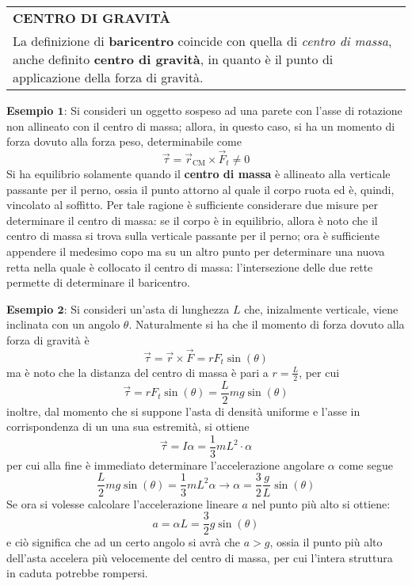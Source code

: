 \documentclass[a4paper]{extarticle}
\renewcommand\arraystretch{}
\begin{document}
\vspace{1em}
\setlength{\tabcolsep}{14pt}
\renewcommand{\arraystretch}{2}
\noindent
\begin{tabularx}{\textwidth}{@{}|P|@{}}
    \hline
    {\textbf{CENTRO DI GRAVITÀ}}\\
    \parbox{\linewidth}{La definizione di \textbf{baricentro} coincide con quella di \emph{centro di massa}, anche definito \textbf{centro di gravità}, in quanto è il punto di applicazione della forza di gravità.
    \vspace{3mm}}\\
    \hline
\end{tabularx}

\vspace{1em}
\noindent
\textbf{Esempio $\boldsymbol{1}$}: Si consideri un oggetto sospeso ad una parete con l'asse di rotazione non allineato con il centro di massa; allora, in questo caso, si ha un momento di forza dovuto alla forza peso, determinabile come
\[\vec \tau = \vec r_{\text{CM}} \times \vec F_{t} \neq 0\]
Si ha equilibrio solamente quando il \textbf{centro di massa} è allineato alla verticale passante per il perno, ossia il punto attorno al quale il corpo ruota ed è, quindi, vincolato al soffitto. Per tale ragione è sufficiente considerare due misure per determinare il centro di massa: se il corpo è in equilibrio, allora è noto che il centro di massa si trova sulla verticale passante per il perno; ora è sufficiente appendere il medesimo copo ma su un altro punto per determinare una nuova retta nella quale è collocato il centro di massa: l'intersezione delle due rette permette di determinare il baricentro.

\vspace{1em}
\noindent
\textbf{Esempio $\boldsymbol{2}$}: Si consideri un'asta di lunghezza $L$ che, inizalmente verticale, viene inclinata con un angolo $\theta$. Naturalmente si ha che il momento di forza dovuto alla forza di gravità è
\[\vec \tau = \vec r \times \vec F = r F_t \sin(\theta)\]
ma è noto che la distanza del centro di massa è pari a $r=\frac{L}{2}$, per cui
\[\vec \tau = r F_t \sin(\theta) = \frac{L}{2} mg \sin(\theta)\]
inoltre, dal momento che si suppone l'asta di densità uniforme e l'asse in corrispondenza di un una sua estremità, si ottiene
\[\vec \tau=I \alpha = \frac{1}{3}mL^2 \cdot \alpha\]
per cui alla fine è immediato determinare l'accelerazione angolare $\alpha$ come segue
\[\frac{L}{2}mg \sin(\theta)=\frac{1}{3} mL^2 \alpha \longrightarrow \alpha = \frac{3}{2}\frac{g}{L} \sin(\theta)\]
Se ora si volesse calcolare l'accelerazione lineare $a$ nel punto più alto si ottiene:
\[a = \alpha L = \frac{3}{2}g \sin(\theta)\]
e ciò significa che ad un certo angolo si avrà che $a > g$, ossia il punto più alto dell'asta accelera più velocemente del centro di massa, per cui l'intera struttura in caduta potrebbe rompersi.
\end{document}
